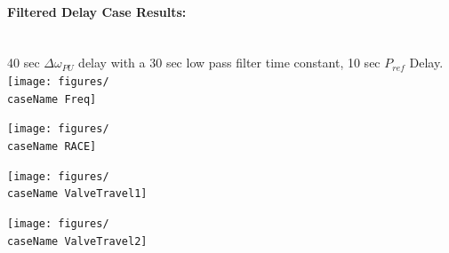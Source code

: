 \documentclass[12pt]{article}
\begin{document}
\paragraph{Filtered Delay Case Results: } \ \\
40 sec $\Delta \omega_{PU}$ delay with a 30 sec low pass filter time constant, 10 sec  $P_{ref}$ Delay.
\\
\texttt{[image: figures/\\caseName Freq]}

\texttt{[image: figures/\\caseName RACE]}

\texttt{[image: figures/\\caseName ValveTravel1]}

\texttt{[image: figures/\\caseName ValveTravel2]}



		
\end{document}

